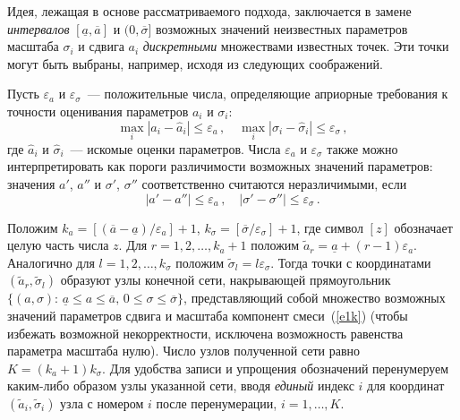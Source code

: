 \begin{multicols}{2}
Идея, лежащая в основе рассматриваемого подхода, заключается в
замене {\it интервалов} $[\underline a, \overline a]$ и
$(0,\overline\sigma]$ возможных значений неизвестных параметров
масштаба $\sigma_i$ и сдвига $a_i$ {\it дискретными} множествами
известных точек. Эти точки могут быть выбраны, например, исходя из
следующих соображений.

Пусть $\varepsilon_a$ и $\varepsilon_{\sigma}$~--- положительные
числа, определяющие априорные требования к точности оценивания
параметров $a_i$ и $\sigma_i$:
\begin{equation}
\max_i|a_i-\widehat a_i|\le
\varepsilon_a\,,\quad \max_i|\sigma_i-\widehat\sigma_i|\le
\varepsilon_{\sigma}\,,
\label{e2k}
\end{equation}
где $\widehat a_i$ и
$\widehat\sigma_i$~--- искомые оценки параметров. Числа
$\varepsilon_a$ и $\varepsilon_{\sigma}$ также можно
интерпретировать как пороги различимости возможных значений
параметров: значения $a'$, $a''$ и $\sigma'$, $\sigma''$
соответственно считаются неразличимыми, если
\begin{equation}
|a'-a''|\le\varepsilon_a\,,\quad  |\sigma'-\sigma''|\le
\varepsilon_{\sigma}\,.
\label{e3k}
\end{equation}

Положим $k_{a}=[(\overline a-\underline a)/\varepsilon_a]+1$,
$k_{\sigma}=[\overline\sigma/\varepsilon_{\sigma}]+1$, где символ
$[z]$ обозначает целую часть числа $z$. Для $r=1,2,\ldots,k_{a}+1$
положим $\widetilde a_r=\underline a+(r-1)\varepsilon_a$.
Аналогично для $l=1,2,\ldots,k_{\sigma}$ положим $\widetilde
\sigma_l=l \varepsilon_{\sigma}$. Тогда точки с координатами
$(\widetilde a_r,\widetilde\sigma_l)$ образуют узлы конечной сети,
накрывающей прямоугольник $\{(a,\sigma):\,\underline a\le
a\le\overline a,\,0\le\sigma\le\overline\sigma\}$, представляющий
собой множество возможных значений параметров сдвига и масштаба
компонент смеси~(\ref{e1k}) (чтобы избежать возможной некорректности,
исключена возможность равенства параметра масштаба нулю). Число
узлов полученной сети равно $K=(k_{a}+1)k_{\sigma}$. Для удобства
записи и упрощения обозначений перенумеруем каким-либо образом
узлы указанной сети, вводя {\it единый} индекс $i$ для координат
$(\widetilde a_i,\widetilde \sigma_i)$ узла с номером $i$ после
перенумерации, $i=1,\ldots,K$.


\end{multicols}
